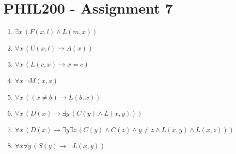 \documentclass{article}
\begin{document}
\section*{PHIL200 - Assignment 7}

\begin{enumerate}
    \item
          $
              \exists x \, (F(x, l) \wedge L(m, x))
          $

    \item
          $
              \forall x \, (U(x, l) \rightarrow A(x))
          $

    \item
          $
              \forall x \, (L(c, x) \rightarrow x = c)
          $

    \item
          $
              \forall x \, \neg M(x, x)
          $

    \item
          $
              \forall x \, ((x \ne b) \rightarrow L(b, x))
          $

    \item
          $
              \forall x \, (D(x) \rightarrow \exists y \, (C(y) \wedge L(x, y)))
          $

    \item
          $
              \forall x \, (D(x) \rightarrow \exists y \exists z \, (C(y) \wedge C(z) \wedge y \ne z \wedge L(x, y) \wedge L(x, z)))
          $

    \item
          $
              \forall x \forall y \, (S(y) \rightarrow \neg L(x, y))
          $
\end{enumerate}
\end{document}
